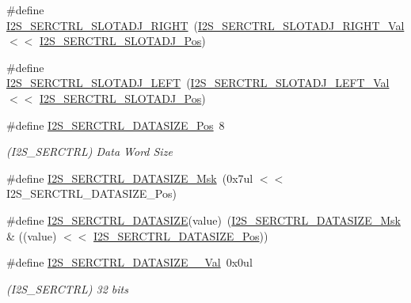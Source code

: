 \begin{DoxyCompactItemize}
\#define \mbox{\hyperlink{group___s_a_m_d21___i2_s_gaa9a556698bd3243bedc1abb670d0e662}{I2\+S\+\_\+\+S\+E\+R\+C\+T\+R\+L\+\_\+\+S\+L\+O\+T\+A\+D\+J\+\_\+\+R\+I\+G\+HT}}~(\mbox{\hyperlink{group___s_a_m_d21___i2_s_gaebdc227dfc6b1252e5746ae3f4fba851}{I2\+S\+\_\+\+S\+E\+R\+C\+T\+R\+L\+\_\+\+S\+L\+O\+T\+A\+D\+J\+\_\+\+R\+I\+G\+H\+T\+\_\+\+Val}} $<$$<$ \mbox{\hyperlink{group___s_a_m_d21___i2_s_gaecf7ae96e5e40f978e66891a29e62c27}{I2\+S\+\_\+\+S\+E\+R\+C\+T\+R\+L\+\_\+\+S\+L\+O\+T\+A\+D\+J\+\_\+\+Pos}})
\item 
\#define \mbox{\hyperlink{group___s_a_m_d21___i2_s_ga66a23b7e14e1012541d08311ad59874e}{I2\+S\+\_\+\+S\+E\+R\+C\+T\+R\+L\+\_\+\+S\+L\+O\+T\+A\+D\+J\+\_\+\+L\+E\+FT}}~(\mbox{\hyperlink{group___s_a_m_d21___i2_s_ga004c611748c4300fa2bc2f4f4e76d06b}{I2\+S\+\_\+\+S\+E\+R\+C\+T\+R\+L\+\_\+\+S\+L\+O\+T\+A\+D\+J\+\_\+\+L\+E\+F\+T\+\_\+\+Val}}  $<$$<$ \mbox{\hyperlink{group___s_a_m_d21___i2_s_gaecf7ae96e5e40f978e66891a29e62c27}{I2\+S\+\_\+\+S\+E\+R\+C\+T\+R\+L\+\_\+\+S\+L\+O\+T\+A\+D\+J\+\_\+\+Pos}})
\item 
\#define \mbox{\hyperlink{group___s_a_m_d21___i2_s_gacf8b6693f0fedbcbc080607dcf13c0c2}{I2\+S\+\_\+\+S\+E\+R\+C\+T\+R\+L\+\_\+\+D\+A\+T\+A\+S\+I\+Z\+E\+\_\+\+Pos}}~8
\begin{DoxyCompactList}\small\item\em (I2\+S\+\_\+\+S\+E\+R\+C\+T\+RL) Data Word Size \end{DoxyCompactList}\item 
\#define \mbox{\hyperlink{group___s_a_m_d21___i2_s_gae3f7492f15415b115f577e086d90b65e}{I2\+S\+\_\+\+S\+E\+R\+C\+T\+R\+L\+\_\+\+D\+A\+T\+A\+S\+I\+Z\+E\+\_\+\+Msk}}~(0x7ul $<$$<$ I2\+S\+\_\+\+S\+E\+R\+C\+T\+R\+L\+\_\+\+D\+A\+T\+A\+S\+I\+Z\+E\+\_\+\+Pos)
\item 
\#define \mbox{\hyperlink{group___s_a_m_d21___i2_s_ga4744fc9fd70255ff2ca879920e25713c}{I2\+S\+\_\+\+S\+E\+R\+C\+T\+R\+L\+\_\+\+D\+A\+T\+A\+S\+I\+ZE}}(value)~(\mbox{\hyperlink{group___s_a_m_d21___i2_s_gae3f7492f15415b115f577e086d90b65e}{I2\+S\+\_\+\+S\+E\+R\+C\+T\+R\+L\+\_\+\+D\+A\+T\+A\+S\+I\+Z\+E\+\_\+\+Msk}} \& ((value) $<$$<$ \mbox{\hyperlink{group___s_a_m_d21___i2_s_gacf8b6693f0fedbcbc080607dcf13c0c2}{I2\+S\+\_\+\+S\+E\+R\+C\+T\+R\+L\+\_\+\+D\+A\+T\+A\+S\+I\+Z\+E\+\_\+\+Pos}}))
\item 
\#define \mbox{\hyperlink{group___s_a_m_d21___i2_s_gaf6d6db384e5e6f3bb0490f6312d91ed7}{I2\+S\+\_\+\+S\+E\+R\+C\+T\+R\+L\+\_\+\+D\+A\+T\+A\+S\+I\+Z\+E\+\_\+\_\+\+Val}}~0x0ul
\begin{DoxyCompactList}\small\item\em (I2\+S\+\_\+\+S\+E\+R\+C\+T\+RL) 32 bits \end{DoxyCompactList}\item 

\end{DoxyCompactItemize}

